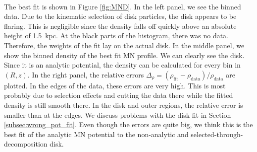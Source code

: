 \\The best fit is shown in Figure \ref{fig:MND}. In the left panel, we see the binned data. Due to the kinematic selection of disk particles, the disk appears to be flaring. This is negligible since the density falls off quickly above an absolute height of \SI{1.5}{kpc}. At the black parts of the histogram, there was no data. Therefore, the weights of the fit lay on the actual disk. In the middle panel, we show the binned density of the best fit \ac{MN} profile. We can clearly see the disk. Since it is an analytic potential, the density can be calculated for every bin in $(R, z)$. In the right panel, the relative errors \(\Delta_\rho = (\rho_{\mathrm{fit}}- \rho_{\mathrm{data}})/\rho_{\mathrm{data}}\) are plotted. In the edges of the data, these errors are very high. This is most probably due to selection effects and cutting the data there while the fitted density is still smooth there. In the disk and outer regions, the relative error is smaller than at the edges. We discuss problems with the disk fit in Section \ref{subsec:wrong_pot_fit}. Even though the errors are quite big, we think this is the best fit of the analytic \ac{MN} potential to the non-analytic and selected-through-decomposition disk. 


